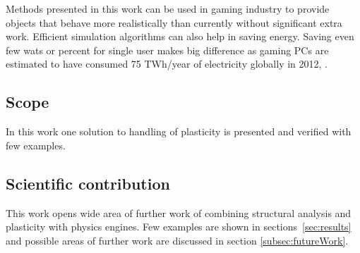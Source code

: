 Methods presented in this work can be used in gaming industry to provide objects that behave more realistically than currently without significant extra work. Efficient simulation algorithms can also help in saving energy. Saving even few wats or percent for single user makes big difference as gaming PCs are estimated to have consumed 75 TWh/year of electricity globally in 2012, \cite{gaming.energy}.

\subsection{Scope}

In this work one solution to handling of plasticity is presented and verified with few examples.

\subsection{Scientific contribution}

This work opens wide area of further work of combining structural analysis and plasticity with physics engines.
Few examples are shown in sections~\ref{sec:results} and possible areas of further work are discussed in section \ref{subsec:futureWork}.

\cleardoublepage
